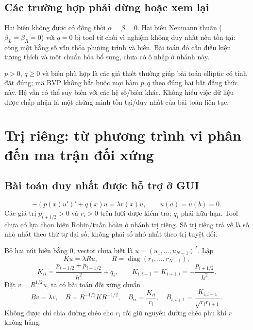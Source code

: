 \subsection{Các trường hợp phải dừng hoặc xem lại}
Hai biên không được có đồng thời $\alpha=\beta=0$. Hai biên Neumann thuần ($\beta_L=\beta_R=0$) với $q=0$ bị tool từ chối vì nghiệm không duy nhất nếu tồn tại: cộng một hằng số vẫn thỏa phương trình và biên. Bài toán đó cần điều kiện tương thích và một chuẩn hóa bổ sung, chưa có ô nhập ở nhánh này.

$p>0$, $q\ge0$ và biên phù hợp là các giả thiết thường giúp bài toán elliptic có tính đặt đúng; mã BVP không bắt buộc mọi hàm $p,q$ theo đúng hai bất đẳng thức này. Hệ vẫn có thể suy biến với các hệ số/biên khác. Không hiểu việc dữ liệu được chấp nhận là một chứng minh tồn tại/duy nhất của bài toán liên tục.

\section{Trị riêng: từ phương trình vi phân đến ma trận đối xứng}
\subsection{Bài toán duy nhất được hỗ trợ ở GUI}
\[
 -(p(x)u')'+q(x)u=\lambda r(x)u,\qquad u(a)=u(b)=0.
\]
Các giá trị $p_{i+1/2}>0$ và $r_i>0$ trên lưới được kiểm tra; $q_i$ phải hữu hạn. Tool chưa có lựa chọn biên Robin/tuần hoàn ở nhánh trị riêng. Số trị riêng trả về là số nhỏ nhất theo thứ tự đại số, không phải số nhỏ nhất theo trị tuyệt đối.

Bỏ hai nút biên bằng 0, vector chưa biết là $u=(u_1,\ldots,u_{N-1})^T$. Lập
\[
 Ku=\lambda Ru,\qquad R=\operatorname{diag}(r_1,\ldots,r_{N-1}),
\]
\[
 K_{ii}=\frac{p_{i-1/2}+p_{i+1/2}}{h^2}+q_i,
 \qquad K_{i,i+1}=K_{i+1,i}=-\frac{p_{i+1/2}}{h^2}.
\]
Đặt $v=R^{1/2}u$, ta có bài toán đối xứng chuẩn
\[
 Bv=\lambda v,\quad B=R^{-1/2}KR^{-1/2},\quad
 B_{ii}=\frac{K_{ii}}{r_i},\quad
 B_{i,i+1}=\frac{K_{i,i+1}}{\sqrt{r_ir_{i+1}}}.
\]
Không được chỉ chia đường chéo cho $r_i$ rồi giữ nguyên đường chéo phụ khi $r$ không hằng.

